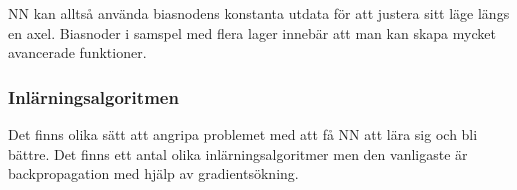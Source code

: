 \documentclass[a4paper,10pt]{article}
\begin{document}
\begin{figure}[ht]
\end{figure}


NN kan alltså använda biasnodens konstanta utdata för att justera sitt läge längs en axel. Biasnoder i samspel med flera lager innebär att man kan skapa mycket avancerade funktioner.

\subsubsection{Inlärningsalgoritmen}
Det finns olika sätt att angripa problemet med att få NN att lära sig och bli bättre. Det finns ett antal olika inlärningsalgoritmer men den vanligaste är backpropagation med hjälp av gradientsökning.
\end{document}
